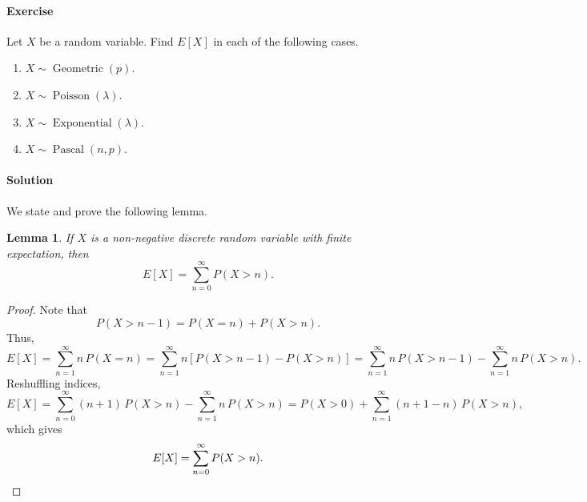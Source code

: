 \documentclass[10pt]{article}
\newcounter{prob}
\def\problem{\stepcounter{prob}\paragraph{Exercise \arabic{prob}}}
\def\solution{\paragraph{Solution}}
\newcommand\op[1]{\operatorname{#1}}
\newcommand\E[1]{E[#1]}
\newtheorem*{lemma}{Lemma}
\begin{document}
        \problem Let $X$ be a random variable. Find $\E{X}$ in each of the following
        cases. \begin{enumerate}
            \itemsep0em
            \item $X \sim \op{Geometric}(p)$.
            \item $X \sim \op{Poisson}(\lambda)$.
            \item $X \sim \op{Exponential}(\lambda)$.
            \item $X \sim \op{Pascal}(n, p)$.
        \end{enumerate}

        \solution We state and prove the following lemma. 
        \begin{lemma}
            If $X$ is a non-negative discrete random variable with finite
            expectation, then \[
                \E{X} = \sum_{n = 0}^\infty P(X > n).
            \]
        \end{lemma}
        \begin{proof}
            Note that \[
                P(X > n - 1) = P(X = n) + P(X > n).
            \] Thus, \[
                \E{X} = \sum_{n = 1}^\infty n\,P(X = n) = \sum_{n = 1}^\infty
                n\left[P(X > n - 1) - P(X > n)\right] = \sum_{n = 1}^\infty n\, P(X
                > n - 1) - \sum_{n = 1}^\infty n\, P(X > n).
            \] Reshuffling indices, \[
                \E{X} = \sum_{n = 0}^\infty (n + 1)\,P(X > n) - \sum_{n = 1}^\infty
                n\, P(X > n) = P(X > 0) + \sum_{n = 1}^\infty (n + 1 - n)\, P(X >
                n),
            \] which gives \[
                \E{X} = \sum_{n = 0}^\infty P(X > n). \qedhere
            \] 
        \end{proof}
\end{document}

